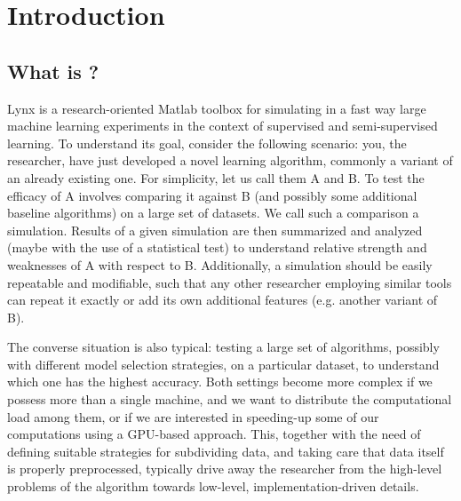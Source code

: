 \chapter*{Introduction}

\section*{What is \toolboxname?}

Lynx is a research-oriented Matlab toolbox for simulating in a fast way large machine learning experiments in the context of supervised and semi-supervised learning. To understand its goal, consider the following scenario: you, the researcher, have just developed a novel learning algorithm, commonly a variant of an already existing one. For simplicity, let us call them A and B. To test the efficacy of A involves comparing it against B (and possibly some additional baseline algorithms) on a large set of datasets. We call such a comparison a simulation. Results of a given simulation are then summarized and analyzed (maybe with the use of a statistical test) to understand relative strength and weaknesses of A with respect to B. Additionally, a simulation should be easily repeatable and modifiable, such that any other researcher employing similar tools can repeat it exactly or add its own additional features (e.g. another variant of B).

The converse situation is also typical: testing a large set of algorithms, possibly with different model selection strategies, on a particular dataset, to understand which one has the highest accuracy. Both settings become more complex if we possess more than a single machine, and we want to distribute the computational load among them, or if we are interested in speeding-up some of our computations using a GPU-based approach. This, together with the need of defining suitable strategies for subdividing data, and taking care that data itself is properly preprocessed, typically drive away the researcher from the high-level problems of the algorithm towards low-level, implementation-driven details.

